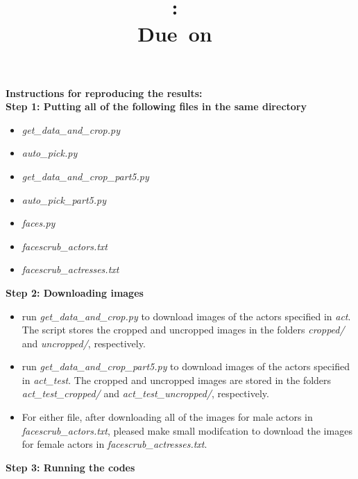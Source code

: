 \documentclass{article}
\title{
\vspace{2in}
\textmd{\textbf{\hmwkClass:\ \hmwkTitle}}\\
\normalsize\vspace{0.1in}\small{Due\ on\ \hmwkDueDate}\\
\vspace{0.1in}
\vspace{3in}
}
\author{\textbf{\hmwkAuthorName}}
\begin{document}
\maketitle
\clearpage

\textbf{Instructions for reproducing the results:} \\
\textbf{Step 1: Putting all of the following files in the same directory}
\begin{itemize}
	\item \textit{get\_data\_and\_crop.py}
	\item \textit{auto\_pick.py}
	\item \textit{get\_data\_and\_crop\_part5.py}  
	\item \textit{auto\_pick\_part5.py}
	\item \textit{faces.py}
	\item \textit{facescrub\_actors.txt}
	\item \textit{facescrub\_actresses.txt}
\end{itemize}
\textbf{Step 2: Downloading images}
\begin{itemize}
	\item run \textit{get\_data\_and\_crop.py} to download images of the actors specified in \textit{act}. The script stores the cropped and uncropped images in the folders \textit{cropped/} and \textit{uncropped/}, respectively.
	\item run \textit{get\_data\_and\_crop\_part5.py}  to download images of the actors specified in \textit{act\_test}. The cropped and uncropped images are stored in the folders \textit{act\_test\_cropped/} and \textit{act\_test\_uncropped/}, respectively.
	\item For either file, after downloading all of the images for male actors in \textit{facescrub\_actors.txt}, pleased make small modifcation to download the images for female actors in \textit{facescrub\_actresses.txt}.
\end{itemize}
\textbf{Step 3: Running the codes}
\end{document}
